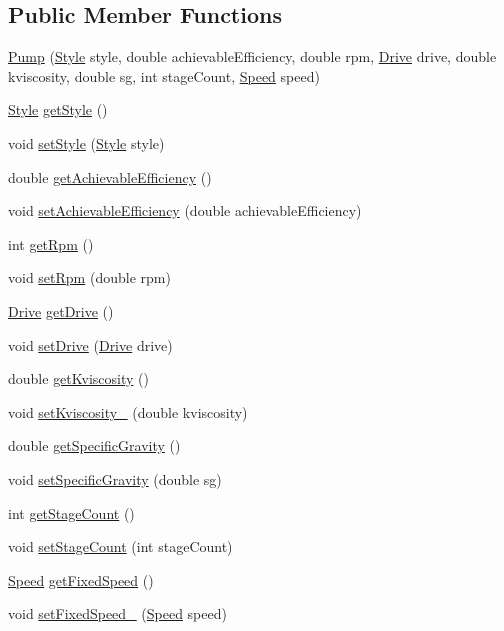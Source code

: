 \subsection*{Public Member Functions}
\begin{DoxyCompactItemize}
\item 
\hyperlink{class_pump_a40479645281006efd81d3074f64d84ea}{Pump} (\hyperlink{class_pump_aef354601ce4218258cc898b35a1e90ff}{Style} style, double achievable\+Efficiency, double rpm, \hyperlink{class_pump_a32bf0ade131a11bb3b3fb374f638e983}{Drive} drive, double kviscosity, double sg, int stage\+Count, \hyperlink{class_pump_ae443603074ebca82f0b89209482d10b6}{Speed} speed)
\item 
\hyperlink{class_pump_aef354601ce4218258cc898b35a1e90ff}{Style} \hyperlink{class_pump_ab75d877769b5232c5ab7b4d92940579a}{get\+Style} ()
\item 
void \hyperlink{class_pump_a4852cb47f40a46ba84c7dff91d1abd53}{set\+Style} (\hyperlink{class_pump_aef354601ce4218258cc898b35a1e90ff}{Style} style)
\item 
double \hyperlink{class_pump_acf100af543142ab8404fc0ce2df1d157}{get\+Achievable\+Efficiency} ()
\item 
void \hyperlink{class_pump_a183f83fcc4b77e330451000df4d91046}{set\+Achievable\+Efficiency} (double achievable\+Efficiency)
\item 
int \hyperlink{class_pump_a66870deae37979d64a910b89c6977b26}{get\+Rpm} ()
\item 
void \hyperlink{class_pump_a7478d85c3b89cda275b039673603a785}{set\+Rpm} (double rpm)
\item 
\hyperlink{class_pump_a32bf0ade131a11bb3b3fb374f638e983}{Drive} \hyperlink{class_pump_a7eae412e42d0a3351408391cd5fbef4e}{get\+Drive} ()
\item 
void \hyperlink{class_pump_a54b6fc1aa44cc8377914ccb94738723a}{set\+Drive} (\hyperlink{class_pump_a32bf0ade131a11bb3b3fb374f638e983}{Drive} drive)
\item 
double \hyperlink{class_pump_a7b834ffb06cbfd643043e3a26ca1af6e}{get\+Kviscosity} ()
\item 
void \hyperlink{class_pump_a26d1d10908f91137f5148540ceb6520a}{set\+Kviscosity\+\_\+} (double kviscosity)
\item 
double \hyperlink{class_pump_ad3526b01094bfdb382305ca5b6731d53}{get\+Specific\+Gravity} ()
\item 
void \hyperlink{class_pump_a1032a4ec4dd4002889f4b848af7c9e01}{set\+Specific\+Gravity} (double sg)
\item 
int \hyperlink{class_pump_a2a8754f53b289dc41f3220adc4eb56e1}{get\+Stage\+Count} ()
\item 
void \hyperlink{class_pump_a28943405616a792c970b7e9bbf01c1b2}{set\+Stage\+Count} (int stage\+Count)
\item 
\hyperlink{class_pump_ae443603074ebca82f0b89209482d10b6}{Speed} \hyperlink{class_pump_ae9a63b7e616ba2ef7723d1040af241b4}{get\+Fixed\+Speed} ()
\item 
void \hyperlink{class_pump_a9e74b484f468a14076fb12d8b991e24b}{set\+Fixed\+Speed\+\_\+} (\hyperlink{class_pump_ae443603074ebca82f0b89209482d10b6}{Speed} speed)
\end{DoxyCompactItemize}


